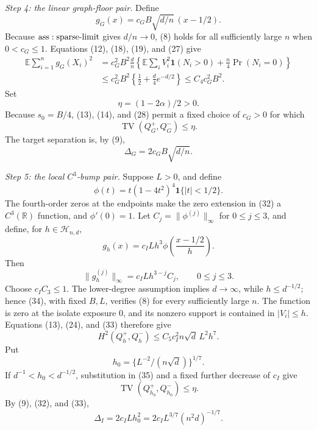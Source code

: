 \textit{Step 4: the linear graph-floor pair.}
Define
\[
 g_G(x)=c_GB\sqrt{d/n}\,(x-1/2).
\tag{27}
\]
Because \({\rm ass:sparse\text{-}limit}\) gives \(d/n\to0\), (8) holds for all sufficiently large \(n\) when \(0<c_G\leq1\).  Equations (12), (18), (19), and (27) give
\[
 \begin{aligned}
 \mathbb E\sum_{i=1}^ng_G(X_i)^2
 &=c_G^2B^2\frac dn
 \left\{\mathbb E\sum_iV_i^2\mathbf1(N_i>0)
       +\frac n4\Pr(N_i=0)\right\}\\
 &\leq c_G^2B^2\left\{\frac12+\frac d4e^{-d/2}\right\}
 \leq C_4c_G^2B^2.
 \end{aligned}
\tag{28}
\]
Set
\[
 \eta=(1-2\alpha)/2>0.
\tag{29}
\]
Because \(s_0=B/4\), (13), (14), and (28) permit a fixed choice of \(c_G>0\) for which
\[
 \operatorname{TV}(Q_G^+,Q_G^-)\leq\eta.
\tag{30}
\]
The target separation is, by (9),
\[
 \Delta_G=2c_GB\sqrt{d/n}.
\tag{31}
\]

\textit{Step 5: the local \(C^3\)-bump pair.}
Suppose \(L>0\), and define
\[
 \phi(t)=t(1-4t^2)^4\mathbf1\{|t|<1/2\}.
\tag{32}
\]
The fourth-order zeros at the endpoints make the zero extension in (32) a \(C^3(\mathbb R)\) function, and \(\phi'(0)=1\).  Let \(C_j=\|\phi^{(j)}\|_\infty\) for \(0\leq j\leq3\), and define, for \(h\in\mathcal H_{n,d}\),
\[
 g_h(x)=c_ILh^3\phi\!\left(\frac{x-1/2}{h}\right).
\tag{33}
\]
Then
\[
 \|g_h^{(j)}\|_\infty=c_ILh^{3-j}C_j,
 \qquad 0\leq j\leq3.
\tag{34}
\]
Choose \(c_IC_3\leq1\).  The lower-degree assumption implies \(d\to\infty\), while \(h\leq d^{-1/2}\); hence (34), with fixed \(B,L\), verifies (8) for every sufficiently large \(n\).  The function is zero at the isolate exposure \(0\), and its nonzero support is contained in \(|V_i|\leq h\).  Equations (13), (24), and (33) therefore give
\[
 H^2(Q_h^+,Q_h^-)
 \leq C_5c_I^2n\sqrt d\,L^2h^7.
\tag{35}
\]
Put
\[
 h_0=\{L^{-2}/(n\sqrt d)\}^{1/7}.
\tag{36}
\]
If \(d^{-1}<h_0<d^{-1/2}\), substitution in (35) and a fixed further decrease of \(c_I\) give
\[
 \operatorname{TV}(Q_{h_0}^+,Q_{h_0}^-)\leq\eta.
\tag{37}
\]
By (9), (32), and (33),
\[
 \Delta_I=2c_ILh_0^2
 =2c_IL^{3/7}(n^2d)^{-1/7}.
\tag{38}
\]

